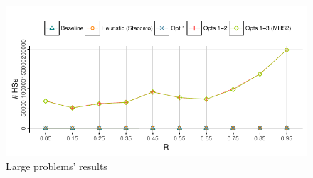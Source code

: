 \begin{figure}[!ht]
  \includegraphics[trim=0.5em 0em 1em 4em, clip, page=6]{figures/mhs2/figures/optim_large}
  \caption{Large problems' results\label{fig:mhs2o:results:large}}
\end{figure}



